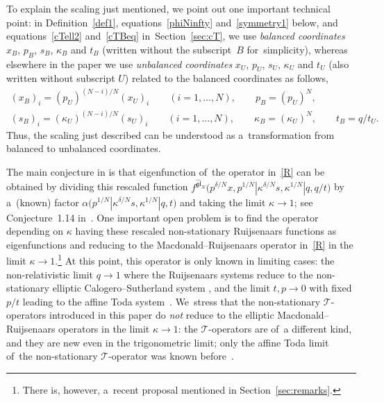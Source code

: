 \documentclass[pdftex]{sigma}%
\numberwithin{equation}{section}
\newcommand{\cT}{{\mathcal T}}
\begin{document}
\begin{Remark}\label{rem:balanced}
To explain the scaling just mentioned, we point out one important technical point: in Definition~\ref{def1}, equations~\eqref{phiNinfty} and~\eqref{symmetry1} below, and equations~\eqref{cTell2} and~\eqref{cTBeq} in~Section~\ref{sec:cT}, we use {\em balanced coordinates} $x_B$, $p_B$, $s_B$, $\kappa_B$ and $t_B$ (written without the subscript~$B$ for~simplicity), whereas elsewhere in the paper we use {\em unbalanced coordinates} $x_U$, $p_U$, $s_U$, $\kappa_U$ and $t_U$ (also written without subscript $U$) related to the balanced coordinates as follows,
\begin{gather*}
(x_B)_i = (p_U)^{(N-i)/N}(x_U)_i \qquad (i=1,\dots,N), \qquad p_B =(p_U)^N,
\\
(s_B)_i = (\kappa_U)^{(N-i)/N}(s_U)_i \qquad (i=1,\dots,N), \qquad
\kappa_B=(\kappa_U)^N,\qquad t_B = q/t_U .
\end{gather*}
Thus, the scaling just described can be understood as a~transformation from balanced to unbalanced coordinates.
\end{Remark}

The main conjecture in \cite{S} is that eigenfunction of~the operator in~\eqref{R} can be obtai\-ned by dividing this rescaled function $f^{\widehat{\mathfrak{gl}}_N}\big(p^{\delta/N}x,p^{1/N}|\kappa^{\delta/N} s,\kappa^{1/N}|q,q/t\big)$ by a~(known) factor $\alpha\big(p^{1/N}|\kappa^{\delta/N}s,\kappa^{1/N}|q,t\big)$ and taking the limit $\kappa\to 1$; see Conjecture~1.14 in~\cite{S}. One important open problem is to find the operator depending on $\kappa$ having these rescaled non-stationary Ruijsenaars functions as eigenfunctions and reducing to the Macdonald--Ruijsenaars operator in~\eqref{R} in the limit $\kappa\to 1$.\footnote{There is, however, a~recent proposal mentioned in Section~\ref{sec:remarks}.} At this point, this operator is only known in limiting cases: the non-relativistic limit $q\to 1$ where the Ruijsenaars systems reduce to the non-stationary elliptic Calogero--Sutherland system \cite{S}, and the limit $t,p\to 0$ with fixed $p/t$ leading to the affine Toda system~\cite{S}. We~stress that the non-stationary $\cT$-operators introduced in this paper do {\em not} reduce to the elliptic Macdonald--Ruijsenaars operators in the limit $\kappa\to 1$: the $\cT$-operators are of~a different kind, and they are new even in the trigonometric limit; only the affine Toda limit of~the non-stationary $\cT$-operator was known before~\cite{S}.
\end{document}
